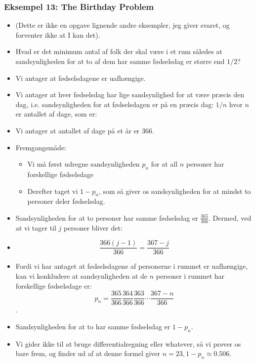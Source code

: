 \documentclass{beamer}
\begin{document}
\begin{frame}[allowframebreaks]
  \frametitle{Eksempel 13: The Birthday Problem}
  \begin{itemize}
  \item (Dette er ikke en opgave lignende andre eksempler, jeg giver svaret, og forventer ikke at I kan det).
  \item Hvad er det minimum antal af folk der skal være i et rum således at sandsynligheden for at to af dem har samme fødselsdag er større end $1/2$?
  \item Vi antager at fødselsdagene er uafhængige. 
  \item Vi antager at hver fødselsdag har lige sandsynlighed for at være præcis den dag, i.e. sandsynligheden for at fødselsdagen er på en præcis dag: $1/n$ hvor $n$ er antallet af dage, som er:
  \item Vi antager at antallet af dage på et år er 366.
  \item Fremgangsmåde:
    \begin{itemize}
    \item Vi må først udregne sandsynligheden $p_{n}$ for at all $n$ personer har forskellige fødselsdage
    \item Derefter taget vi $1-p_{n}$, som så giver os sandsynligheden for at mindst to personer deler fødselsdag.
    \end{itemize}
  \item Sandsynligheden for at to personer har samme fødselsdag er $\frac{365}{366}$. Dermed, ved at vi tager til $j$ personer bliver det:
  \item \[ \frac{366(j-1)}{366} = \frac{367-j}{366} \]
  \item Fordi vi har antaget at fødselsdagene af personerne i rummet er uafhængige, kan vi konkludere at sandsynligheden at de $n$ personer i rummet har forskellige fødselsdage er: \[ p_{n} = \frac{365}{366} \frac{364}{366} \frac{363}{366} \cdots \frac{367-n}{366}\].
  \item Sandsynligheden for at to har samme fødselsdag er $1-p_{n}$.
  \item Vi gider ikke til at bruge differentialregning eller whatever, så vi prøver os bare frem, og finder ud af at denne formel giver $n = 23, 1-p_{n} \approx 0.506$.
  \end{itemize}
\end{frame}
\end{document}

